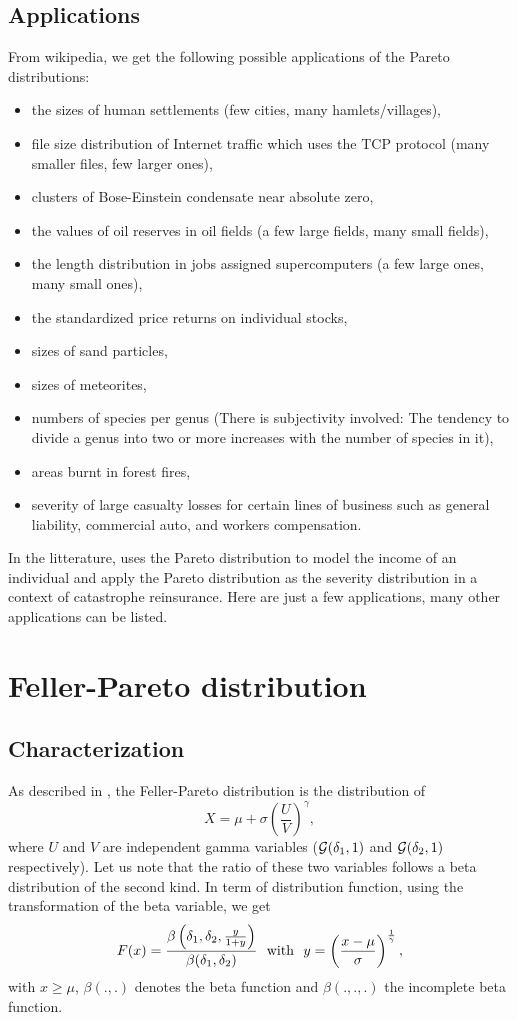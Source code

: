 \subsection{Applications}
From wikipedia, we get the following possible applications of the Pareto distributions:
\begin{itemize}
\item the sizes of human settlements (few cities, many hamlets/villages),
\item file size distribution of Internet traffic which uses the TCP protocol (many smaller files, few larger ones),
\item clusters of Bose-Einstein condensate near absolute zero,
\item the values of oil reserves in oil fields (a few large fields, many small fields),
\item the length distribution in jobs assigned supercomputers (a few large ones, many small ones),
\item the standardized price returns on individual stocks,
\item sizes of sand particles,
\item sizes of meteorites,
\item numbers of species per genus (There is subjectivity involved: The tendency to divide a genus into two or more increases with the number of species in it),
\item areas burnt in forest fires,
\item severity of large casualty losses for certain lines of business such as general liability, commercial auto, and workers compensation.
\end{itemize}
In the litterature, \cite{arnold83} uses the Pareto distribution to model the income of an individual and \cite{froot} apply the Pareto distribution as the severity distribution in a context of catastrophe reinsurance. Here are just a few applications, many other applications can be listed.

\section{Feller-Pareto distribution}
\subsection{Characterization}
As described in \cite{arnold83}, the Feller-Pareto distribution is the distribution of
$$
X = \mu +\sigma\left(\frac{U}{V}\right)^\gamma,
$$
where $U$ and $V$ are independent gamma variables ($\mathcal G(\delta_1,1)$ and $\mathcal G(\delta_2,1)$ respectively). Let us note that the ratio of these two variables follows a beta distribution of the second kind.
In term of distribution function, using the transformation of the beta variable, we get
$$
F(x) = \frac{\beta\left(\delta_1,\delta_2, \frac{y}{1+y}\right)}{\beta(\delta_1,\delta_2)} \textrm{~~with~~} y = \left(\frac{x-\mu}{\sigma}\right)^{\frac{1}{\gamma}},
$$
with $x\geq \mu$, $\beta(.,.)$ denotes the beta function and $\beta(.,.,.)$ the incomplete beta function.

